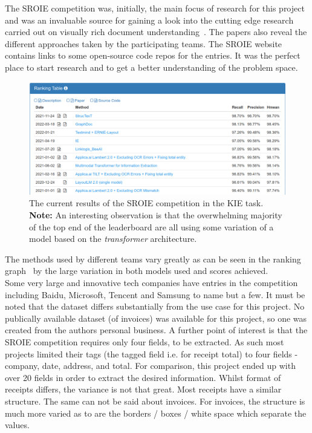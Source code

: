 The SROIE competition was, initially, the main focus of research for this project and was an invaluable source for gaining a look into the cutting
edge research carried out on visually rich document understanding~\autocite{MethodStrucTexTTask}. The papers also reveal the different approaches taken by
the participating teams.
\bigbreak
The SROIE website contains links to some open-source code repos for the entries. It was the perfect place to start research and to get a better
understanding of the problem space.
\begin{figure}[H]
	\centering
	\includegraphics[width=1\linewidth]{figures/SROIE_results.png}
	\caption[SROIE Results (KIE)]{The current results of the SROIE competition in the KIE task.\\
		\textbf{Note:} An interesting observation is that the overwhelming majority of the top end of the leaderboard are all using some variation of a model
		based on the \emph{transformer} architecture.}
	\label{fig:SROIE_results}
\end{figure}
The methods used by different teams vary greatly as can be seen in the ranking graph~\autocite{ResultsICDAR2019a} by the large variation in both models
used and scores achieved.\\
Some very large and innovative tech companies have entries in the competition including Baidu, Microsoft, Tencent and Samsung to name but a few.
\bigbreak
It must be noted that the dataset differs substantially from the use case for this project. No publically available dataset (of invoices) was available for
this project, so one was created from the authors personal business.
\bigbreak
A further point of interest is that the SROIE competition requires only four fields, to be extracted. As such most projects limited their
tags (the tagged field i.e.  for receipt total) to four fields - company, date, address, and total. For comparison, this project
ended up with over 20 fields in order to extract the desired information.
\bigbreak
Whilst format of receipts differs, the variance is not that great. Most receipts have a similar structure. The same can not be said about
invoices. For invoices, the structure is much more varied as to are the borders / boxes / white space which separate the values.
